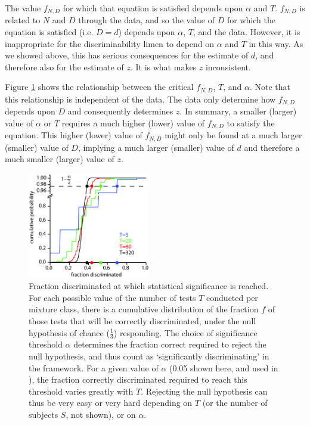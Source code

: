 \documentclass[letterpaper,twocolumn,10pt]{article}
\begin{document}
The value $f_{N,D}$ for which that equation is satisfied depends upon $\alpha$ and $T$.  
$f_{N,D}$ is related to $N$ and $D$ through the data, 
and so the value of $D$ for which the equation is satisfied (i.e. $D=d$)
depends upon $\alpha$, $T$, and the data.  
However, it is inappropriate for the discriminability limen to depend on $\alpha$ and $T$ in this way.  
As we showed above, this has serious consequences for the estimate of $d$, and therefore also for the estimate of $z$.  
It is what makes $z$ inconsistent.  

Figure \ref{fig:alpha_crossing} shows the relationship between the critical $f_{N,D}$, $T$, and $\alpha$.  
Note that this relationship is independent of the data.  
The data only determine how $f_{N,D}$ depends upon $D$ and consequently determines $z$.  
In summary, a smaller (larger) value of $\alpha$ or $T$ requires a much higher (lower) value of $f_{N,D}$ to satisfy the equation.  This higher (lower) value of $f_{N,D}$ might only be found at a much larger (smaller) value of $D$, implying a much larger (smaller) value of $d$ and therefore a much smaller (larger) value of $z$.  

\begin{figure}[!hbt]
    \centering
    \includegraphics[width=0.475\textwidth]{figures/Fig10_alpha_Crossing}
    \caption{
Fraction discriminated at which statistical significance is reached. For each possible value of the number of tests $T$ conducted per mixture class, there is a cumulative distribution of the fraction $f$ of those tests that will be correctly discriminated, under the null hypothesis of chance ($\frac{1}{3}$) responding.  The choice of significance threshold $\alpha$ determines the fraction correct required to reject the null hypothesis, and thus count as `significantly discriminating' in the framework.  For a given value of $\alpha$ (0.05 shown here, and used in \cite{bushdid_humans_2014}), the fraction correctly discriminated required to reach this threshold varies greatly with $T$. Rejecting the null hypothesis can thus be very easy or very hard depending on $T$ (or the number of subjects $S$, not shown), or on $\alpha$.}
    \label{fig:alpha_crossing}
\end{figure} 
\end{document}
